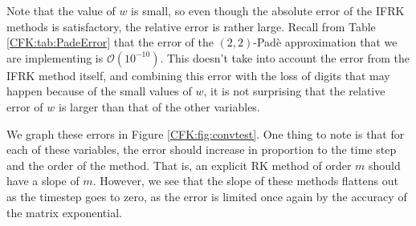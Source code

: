 \documentclass{csri19}
\begin{document}
Note that the value of $w$ is small, so even though the absolute error 
of the IFRK methods is satisfactory, the relative error is rather
 large. Recall from Table \ref{CFK:tab:PadeError} that the error of the 
$(2,2)$-Pad\`e approximation that we are implementing is $\mathcal{O}(10^{-10})$.
This doesn't take into account the error from the IFRK method itself, 
and combining this error with the loss of digits that may happen because of 
the small values of $w$, it is not surprising that the relative error of 
$w$ is larger than that of the other variables.

We graph these errors in Figure \ref{CFK:fig:convtest}. One thing to note
is that for each of these variables, the error should increase in 
proportion to the time step and the order of the method. That is, an 
explicit RK method of order $m$ should have a slope of $m$. However, we 
see that the slope of these methods flattens out as the timestep goes to 
zero, as the error is limited once again by the accuracy of the matrix 
exponential.
\end{document}

